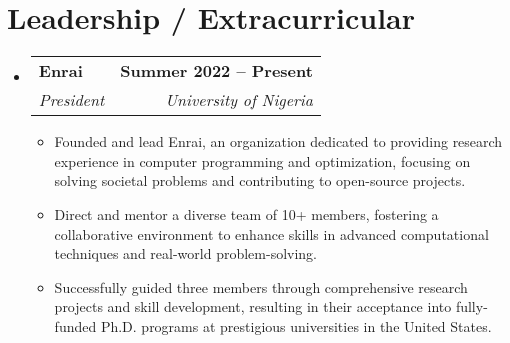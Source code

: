 \documentclass[letterpaper,11pt]{article}
\makeatletter
\newcommand{\resumeItem}[1]{
  \item\small{
    {#1 \vspace{-2pt}}
  }
}
\newcommand{\resumeSubheading}[4]{
  \vspace{-2pt}\item
    \begin{tabular*}{1.0\textwidth}[t]{l@{\extracolsep{\fill}}r}
      \textbf{#1} & \textbf{\small #2} \\
      \textit{\small#3} & \textit{\small #4} \\
    \end{tabular*}\vspace{-7pt}
}
\newcommand{\resumeSubHeadingListStart}{\begin{itemize}[leftmargin=0.0in, label={}]}
\newcommand{\resumeSubHeadingListEnd}{\end{itemize}}
\newcommand{\resumeItemListStart}{\begin{itemize}}
\newcommand{\resumeItemListEnd}{\end{itemize}\vspace{-5pt}}
\makeatother
\begin{document}
\section{Leadership / Extracurricular}
    \resumeSubHeadingListStart
        \resumeSubheading{Enrai}{Summer 2022 -- Present}{President}{University of Nigeria}
            \resumeItemListStart
                \resumeItem{Founded and lead Enrai, an organization dedicated to providing research experience in computer programming and optimization, focusing on solving societal problems and contributing to open-source projects.}
                \resumeItem{Direct and mentor a diverse team of 10+ members, fostering a collaborative environment to enhance skills in advanced computational techniques and real-world problem-solving.}
                \resumeItem{Successfully guided three members through comprehensive research projects and skill development, resulting in their acceptance into fully-funded Ph.D. programs at prestigious universities in the United States.}
            \resumeItemListEnd
        
    \resumeSubHeadingListEnd
\end{document}
